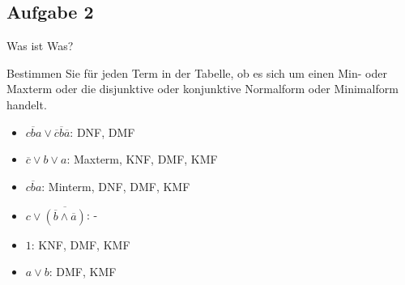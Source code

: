 \documentclass[aspectratio=169,usepdftitle=true,11pt,ngerman,t]{beamer}
\begin{document}
\subsection{Aufgabe 2}
\begin{frame}{Was ist Was?}\onslide<+->
    \begin{exercise}
        Bestimmen Sie für jeden Term in der Tabelle, ob es sich um einen Min- oder Maxterm oder die disjunktive oder konjunktive Normalform oder Minimalform handelt.
    \end{exercise}
    \begin{solve}
    \begin{itemize}[<+->]
        \item \(c\overline ba\vee \overline c\overline b\overline a\): \onslide<+-> DNF, DMF
        \item \(\overline c\vee b\vee a\): \onslide<+-> Maxterm, KNF, DMF, KMF
        \item \(c\overline ba\): \onslide<+-> Minterm, DNF, DMF, KMF
        \item \(c\vee \overline{(\overline b\wedge\overline a)}\): \onslide<+->-
        \item \(1\): \onslide<+-> KNF, DMF, KMF
        \item \(a\vee b\): \onslide<+-> DMF, KMF
    \end{itemize}
    \end{solve}
\end{frame}
\end{document}
